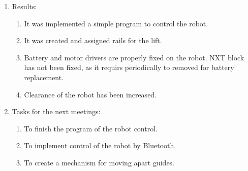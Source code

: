 \begin{enumerate}
\begin{enumerate}
    \end{enumerate}
    
	\item Results:  
	\begin{enumerate}
	  \item It was implemented a simple program to control the robot.
	  
      \item  It was created and assigned rails for the lift.
      
      \item  Battery and motor drivers are properly fixed on the robot. NXT block has not been fixed, as it requirs periodically to removed for battery replacement.
      
      \item Clearance of the robot has been increased.
      
    \end{enumerate}
    
	\item Tasks for the next meetings:
	\begin{enumerate}
	  \item To finish the program of the robot control.
	  
	  \item To implement control of the robot by Bluetooth.
	  
	  \item To create a mechanism for moving apart guides.
	  
    \end{enumerate}     
\end{enumerate}
\fillpage
